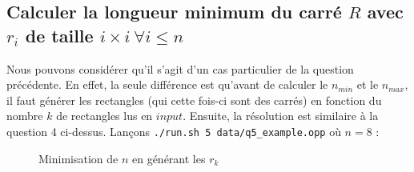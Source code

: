 \documentclass[a4paper]{article}
\begin{document}
\subsection{Calculer la longueur minimum du carré $R$ avec $r_i$ de taille $i\times i \ \forall i \leq n$}
Nous pouvons considérer qu'il s'agit d'un cas particulier de la question précédente. En effet, la seule différence est qu'avant de calculer le $n_{min}$ et le $n_{max}$, il faut générer les rectangles (qui cette fois-ci sont des carrés) en fonction du nombre $k$ de rectangles lus en $input$. Ensuite, la résolution est similaire à la question 4 ci-dessus.
Lançons \texttt{./run.sh 5 data/q5\_example.opp} où $n = 8$ :  
\begin{figure}[H]
  \centering
  \caption{Minimisation de $n$ en générant les $r_k$}
\end{figure}
\end{document}
